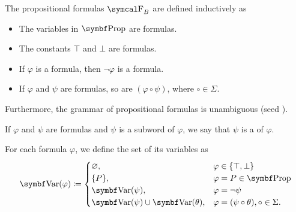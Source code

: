 \begin{definition}\label{def:propositional_formulas}
  The propositional formulas \( \CF_B \) are defined inductively as
  \begin{itemize}
    \item The variables in \( \Bold{Prop} \) are formulas.
    \item The constants \( \top \) and \( \bot \) are formulas.
    \item If \( \varphi \) is a formula, then \( \neg \varphi \) is a formula.
    \item If \( \varphi \) and \( \psi \) are formulas, so are \( (\varphi \circ \psi) \), where \( \circ \in \Sigma \).
  \end{itemize}

  Furthermore, the grammar of propositional formulas is unambiguous (seed ).

  If \( \varphi \) and \( \psi \) are formulas and \( \psi \) is a subword of \( \varphi \), we say that \( \psi \) is a  of \( \varphi \).

  For each formula \( \varphi \), we define the set of its variables as
  \begin{align*}
    \Bold{Var}(\varphi) \coloneqq \begin{cases}
      \varnothing,                              & \varphi \in \{ \top, \bot \}                     \\
      \{ P \},                                  & \varphi = P \in \Bold{Prop}                      \\
      \Bold{Var}(\psi),                         & \varphi = \neg \psi                              \\
      \Bold{Var}(\psi) \cup \Bold{Var}(\theta), & \varphi = (\psi \circ \theta), \circ \in \Sigma.
    \end{cases}
  \end{align*}
\end{definition}

